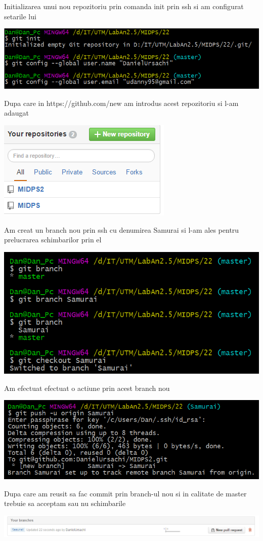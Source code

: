 Initializarea unui nou repozitoriu prin comanda init prin ssh si am configurat setarile lui
\begin{center}
\includegraphics[width=0.7\linewidth]{4repozitoriu}
\end{center}
Dupa care in https://github.com/new am introdus acest repozitoriu si l-am adaugat
\begin{center}
\includegraphics[width=0.5\linewidth]{5repozGit}
\end{center}
Am creat un branch nou prin ssh cu denumirea Samurai si l-am ales pentru prelucrarea schimbarilor prin el
\begin{center}
\includegraphics[width=0.7\linewidth]{6branch1}
\end{center}
Am efectuat efectuat o actiune prin acest branch nou
\begin{center}
\includegraphics[width=0.7\linewidth]{7branch2}
\end{center}
Dupa care am reusit sa fac commit prin branch-ul nou si in calitate de master trebuie sa acceptam sau nu schimbarile
\begin{center}
\includegraphics[width=0.7\linewidth]{8request}
\end{center}

